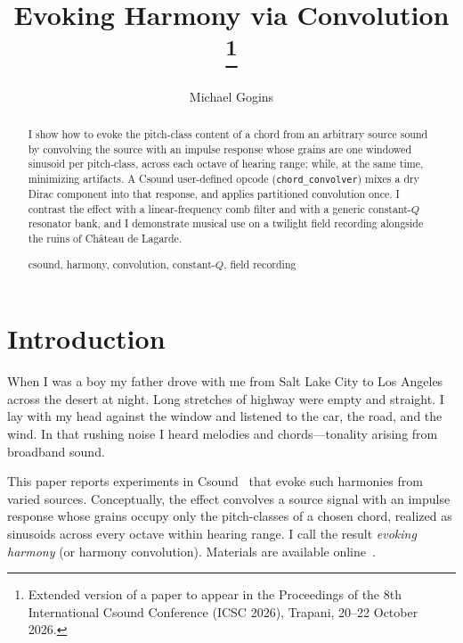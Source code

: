 \documentclass[runningheads,a4paper]{llncs}
\newcommand{\keywords}[1]{\par\addvspace\baselineskip
\noindent\keywordname\enspace\ignorespaces#1}
\begin{document}
\lstset{basicstyle=\ttfamily\small,commentstyle=\ttfamily\small,
tabsize=2,breaklines,showstringspaces=false}

\mainmatter

\title{Evoking Harmony via Convolution%
\texorpdfstring{\thanks{Extended version of a paper
to appear in the Proceedings of the 8th International Csound Conference
(ICSC 2026), Trapani, 20--22 October 2026.}}{}}

\author{Michael Gogins}

\maketitle

\begin{abstract}
I show how to evoke the pitch-class content of a chord from an arbitrary
source sound by convolving the source with an impulse response whose
grains are one windowed sinusoid per pitch-class, across each octave of hearing range; while, at the same time, minimizing artifacts.
A Csound user-defined opcode (\texttt{chord\_convolver}) mixes a dry Dirac component into that
response, and applies partitioned convolution once. I contrast the effect with
a linear-frequency comb filter and with a generic constant-$Q$ resonator bank,
and I demonstrate musical use on a twilight field recording alongside the
ruins of Ch\^{a}teau de Lagarde.
\keywords{csound, harmony, convolution, constant-$Q$, field recording}
\end{abstract}

\section{Introduction}

When I was a boy my father drove with me from Salt Lake City to Los Angeles
across the desert at night. Long stretches of highway were empty and straight.
I lay with my head against the window and listened to the car, the road, and
the wind. In that rushing noise I heard melodies and chords---tonality arising
from broadband sound.

This paper reports experiments in Csound~\cite{csound_home} that evoke
such harmonies from varied sources. Conceptually, the effect convolves a
source signal with an impulse response whose grains occupy only the pitch-classes of
a chosen chord, realized as sinusoids across every octave within hearing range.
I call the result \emph{evoking harmony} (or harmony convolution). Materials
are available online~\cite{gogins_github_io}.
\end{document}
